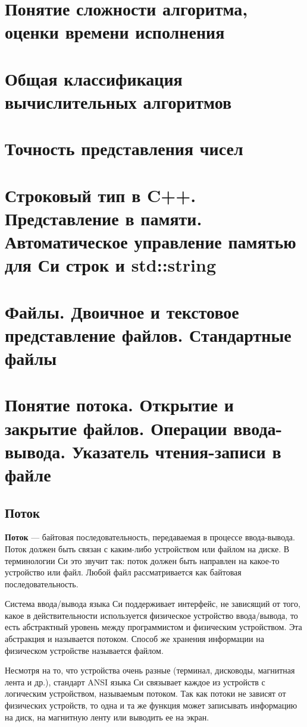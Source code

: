 \section{Понятие сложности алгоритма, оценки времени исполнения}
\section{Общая классификация вычислительных алгоритмов}
\section{Точность представления чисел}
\section{Строковый тип в C++. Представление в памяти. Автоматическое управление памятью для Си строк и std::string}
\section{Файлы. Двоичное и текстовое представление файлов. Стандартные файлы}
\section{Понятие потока. Открытие и закрытие файлов. Операции ввода- вывода. Указатель чтения-записи в файле}
\subsection{Поток}
\textbf{Поток} --- байтовая последовательность, передаваемая в процессе ввода-вывода.
Поток должен быть связан с каким-либо устройством или файлом на диске. В терминологии Си это звучит так:
поток должен быть направлен на какое-то устройство или файл. Любой файл рассматривается как байтовая последовательность.

Система ввода/вывода языка Си поддерживает интерфейс, не зависящий от того, какое в действительности используется физическое
устройство ввода/вывода, то есть абстрактный уровень между программистом и физическим устройством. Эта абстракция и называется
потоком. Способ же хранения информации на физическом устройстве называется файлом.

Несмотря на то, что устройства очень разные (терминал, дисководы, магнитная лента и др.), стандарт ANSI языка Си связывает каждое
из устройств с логическим устройством, называемым потоком. Так как потоки не зависят от физических устройств, то одна и та же функция
может записывать информацию на диск, на магнитную ленту или выводить ее на экран.

